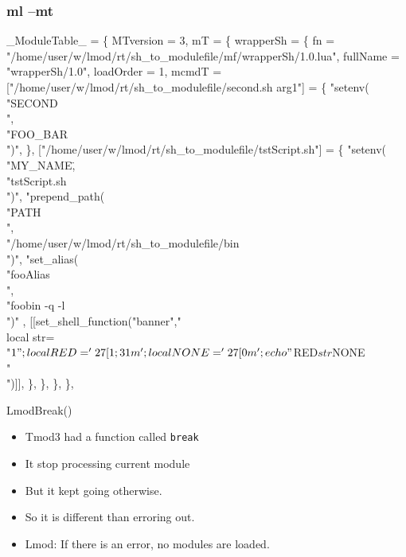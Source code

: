 \documentclass{beamer}
\begin{document}
\begin{frame}[fragile]
  \frametitle{ml --mt}
    {\tiny
\begin{semiverbatim}
\_ModuleTable\_ = \{
  MTversion = 3,
  mT = \{
    wrapperSh = \{
      fn = "/home/user/w/lmod/rt/sh_to_modulefile/mf/wrapperSh/1.0.lua",
      fullName = "wrapperSh/1.0",
      loadOrder = 1,
      mcmdT = {
        ["/home/user/w/lmod/rt/sh_to_modulefile/second.sh arg1"] = \{
          "setenv(\\"SECOND\\",\\"FOO_BAR\\")",
        \},
        ["/home/user/w/lmod/rt/sh_to_modulefile/tstScript.sh"] = \{
          "setenv(\\"MY_NAME\",\\"tstScript.sh\\")",
          "prepend_path(\\"PATH\\",\\"/home/user/w/lmod/rt/sh_to_modulefile/bin\\")",
          "set_alias(\\"fooAlias\\",\\"foobin -q -l\\")"
          , [[set_shell_function("banner"," \\
    local str=\\"$1\\";\\
    local RED='\\27[1;31m';\\
    local NONE='\\27[0m';\\
    echo \\"${RED}${str}${NONE}\\"\\
")]], 
        \},
      \},
    \},
  \},
}
\end{semiverbatim}
    }
\end{frame}

\begin{frame}{LmodBreak()}
  \begin{itemize}
    \item Tmod3 had a function called \texttt{break}
    \item It stop processing current module
    \item But it kept going otherwise.
    \item So it is different than erroring out.
    \item Lmod: If there is an error, no modules are loaded.
  \end{itemize}
\end{frame}
\end{document}

